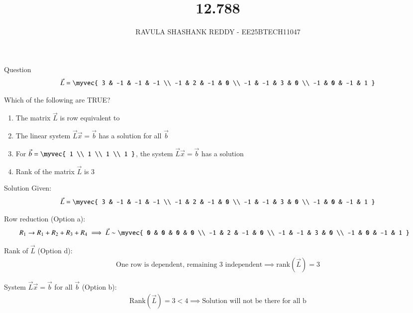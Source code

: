 \documentclass{beamer}
\title %
{12.788}
\author %
{RAVULA SHASHANK REDDY - EE25BTECH11047}
\begin{document}
	
	
	\frame{\titlepage}
	\begin{frame}{Question}
 \begin{align*}
\vec{L} = 
\myvec{
3 & -1 & -1 & -1 \\
-1 & 2 & -1 & 0 \\
-1 & -1 & 3 & 0 \\
-1 & 0 & -1 & 1
}
\end{align*}

Which of the following are TRUE? 


\begin{enumerate}[label=\alph*)]
\item The matrix $\vec{L}$ is row equivalent to 

\item The linear system $\vec{L}\vec{x} = \vec{b}$ has a solution for all $\vec{b}$

\item For $\vec{b} = 
\myvec{
1 \\ 1 \\ 1 \\ 1
}$, the system $\vec{L}\vec{x} = \vec{b}$ has a solution

\item Rank of the matrix $\vec{L}$ is $3$
\end{enumerate}
\end{frame}
\begin{frame}{Solution}
    Given:
\begin{align} 
\vec{L} = 
\myvec{
3 & -1 & -1 & -1 \\
-1 & 2 & -1 & 0 \\
-1 & -1 & 3 & 0 \\
-1 & 0 & -1 & 1
} 
\end{align}

\newpage

Row reduction (Option a):
\begin{align}
R_1 \rightarrow{R_1 + R_2 + R_3 + R_4}\implies 
\vec{L} &\sim
\myvec{
0 & 0 & 0 & 0 \\
-1 & 2 & -1 & 0 \\
-1 & -1 & 3 & 0 \\
-1 & 0 & -1 & 1
} 
\end{align}


 Rank of  $\vec{L}$ (Option d):
 \begin{align}
\text{One row is dependent, remaining 3 independent} \implies \text{rank}(\vec{L}) = 3
\end{align}

System  $\vec{L} \vec{x} = \vec{b}$ for all  $\vec{b}$ (Option b): 
\begin{align}
\text{Rank}(\vec{L}) = 3 < 4 \implies \text{Solution will not be there for all b}
\end{align}
\end{frame}
\end{document}
